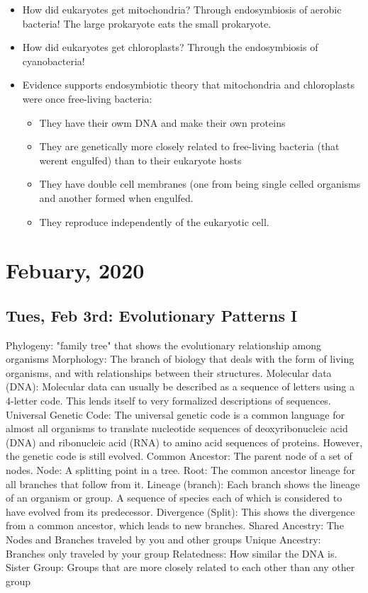 \documentclass[10pt, oneside]{article}
\begin{document}
\begin{itemize}
\item How did eukaryotes get mitochondria? Through endosymbiosis of aerobic bacteria! The large prokaryote eats the small prokaryote.
\item How did eukaryotes get chloroplasts? Through the endosymbiosis of cyanobacteria!
\item Evidence supports endosymbiotic theory that mitochondria and chloroplasts were once free-living bacteria:
\begin{itemize}
\item They have their owm DNA and make their own proteins
\item They are genetically more closely related to free-living bacteria (that werent engulfed) than to their eukaryote hosts
\item They have double cell membranes (one from being single celled organisms and another formed when engulfed.
\item They reproduce independently of the eukaryotic cell.
\end{itemize}
\end{itemize}


\section{Febuary, 2020}

\subsection{Tues, Feb 3rd: Evolutionary Patterns I}
 Phylogeny: "family tree" that shows the evolutionary relationship among organisms
 Morphology: The branch of biology that deals with the form of living organisms, and with relationships between their structures.
 Molecular data (DNA): Molecular data can usually be described as a sequence of letters using a 4-letter code. This lends itself to very formalized descriptions of sequences.
 Universal Genetic Code: The universal genetic code is a common language for almost all organisms to translate nucleotide sequences of deoxyribonucleic acid (DNA) and ribonucleic acid (RNA) to amino acid sequences of proteins. However, the genetic code is still evolved.
 Common Ancestor: The parent node of a set of nodes.
 Node: A splitting point in a tree.
 Root: The common ancestor lineage for all branches that follow from it.
 Lineage (branch): Each branch shows the lineage of an organism or group. A sequence of species each of which is considered to have evolved from its predecessor.
 Divergence (Split): This shows the divergence from a common ancestor, which leads to new branches.
 Shared Ancestry: The Nodes and Branches traveled by you and other groups
 Unique Ancestry: Branches only traveled by your group
 Relatedness: How similar the DNA is.
 Sister Group: Groups that are more closely related to each other than any other group
\end{document}
